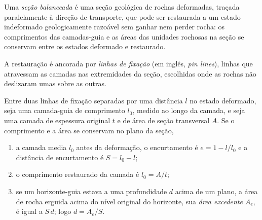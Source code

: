\begin{definition}\label{def:b2:alpine-orogen:balanced}
Uma \emph{seção balanceada} é uma seção geológica de rochas
deformadas, traçada paralelamente à direção de transporte, que pode ser restaurada a um estado indeformado geologicamente
razoável sem ganhar nem perder rocha: os comprimentos das camadas-guia e
as áreas das unidades rochosas na seção se conservam entre os estados deformado e
restaurado.
\end{definition}

A restauração é ancorada por \emph{linhas de fixação} (em inglês, \textit{pin lines}), linhas que atravessam as camadas nas extremidades da
seção, escolhidas onde as rochas não deslizaram umas sobre as outras.

\begin{proposition}\label{prop:b2:alpine-orogen:balance}
Entre duas linhas de fixação separadas por uma distância $l$ no estado deformado, seja uma camada-guia de
comprimento $l_0$, medido ao longo da camada, e seja uma camada de espessura original $t$ e de área
de seção transversal $A$. Se o comprimento e a área se conservam no plano da seção,
\begin{enumerate}
\item a camada media $l_0$ antes da deformação, o encurtamento é
$e = 1 - l/l_0$ e a distância de encurtamento é $S = l_0 - l$;
\item o comprimento restaurado da camada é $l_0 = A/t$;
\item se um horizonte-guia estava a uma profundidade $d$ acima de um  plano, a área de rocha
erguida acima do nível original do horizonte, sua \emph{área excedente} $A_e$, é igual a $S\,d$;
logo $d = A_e/S$.
\end{enumerate}
\end{proposition}

